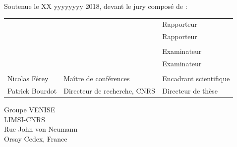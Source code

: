 \begin{titlepage}

Soutenue le XX yyyyyyyy 2018, devant le jury composé de :\\

\begin{center}
	\begin{tabular}{l l l}
	
						& 															& Rapporteur				\\ 
						& 															& Rapporteur				\\
						& 															&							\\ %
						& 															& Examinateur				\\ 				
						&															& Examinateur				\\ 
						& 															&							\\ %
	Nicolas Férey		& Maître de conférences										& Encadrant scientifique	\\
	Patrick Bourdot 	& Directeur de recherche, CNRS								& Directeur de thèse		\\ 
		
	\end{tabular}
\end{center}


\setlength{\columnsep}{7mm}
\setlength{\columnseprule}{0pt}

\noindent Groupe VENISE					\\	
\noindent LIMSI-CNRS					\\
\noindent Rue John von Neumann			\\
 Orsay Cedex, France		\\	

%
%



\end{titlepage}